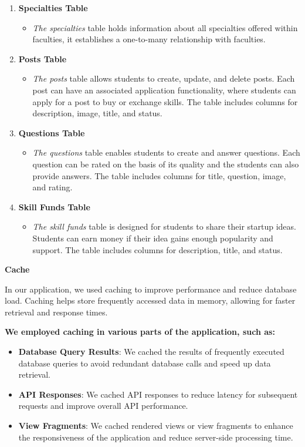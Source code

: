 \begin{enumerate}
\item \textbf{Specialties Table}
\begin{itemize}
\item \textit{The specialties} table holds information about all specialties offered within faculties, it establishes a one-to-many relationship with faculties.
\end{itemize}

\item \textbf{Posts Table}
\begin{itemize}
\item \textit{The posts} table allows students to create, update, and delete posts. Each post can have an associated application functionality, where students can apply for a post to buy or exchange skills. The table includes columns for description, image, title, and status.
\end{itemize}

\newpage
\item \textbf{Questions Table}

\begin{itemize}
\item \textit{The questions} table enables students to create and answer questions. Each question can be rated on the basis of its quality and the students can also provide answers. The table includes columns for title, question, image, and rating.
\end{itemize}

\item \textbf{Skill Funds Table}

\begin{itemize}
\item \textit{The skill funds} table is designed for students to share their startup ideas. Students can earn money if their idea gains enough popularity and support. The table includes columns for description, title, and status.
\end{itemize}
\end{enumerate}
\textbf{Cache}

In our application, we used caching to improve performance and reduce database \cite{dbms} load. Caching helps store frequently accessed data in memory, allowing for faster retrieval and response times.
\vspace{0.5cm}
\par
\textbf{We employed caching in various parts of the application, such as:}

\begin{itemize}
    \item \textbf{Database Query Results}: We cached the results of frequently executed database queries to avoid redundant database calls and speed up data retrieval.
    
    \item \textbf{API Responses}: We cached API responses to reduce latency for subsequent requests and improve overall API performance.
    
    \item \textbf{View Fragments}: We cached rendered views or view fragments to enhance the responsiveness of the application and reduce server-side processing time.
\end{itemize}

